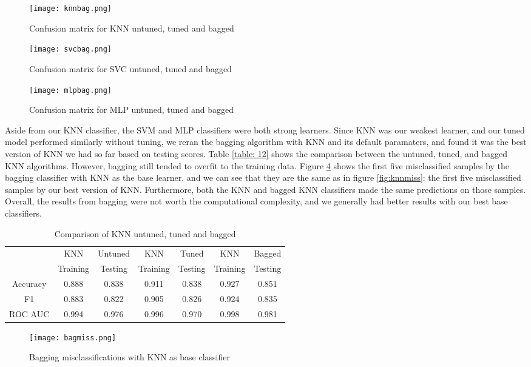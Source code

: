 \documentclass[12pt]{article}
\begin{document}
\begin{figure}[h]
	\centering
	\texttt{[image: knnbag.png]}
	\caption{Confusion matrix for KNN untuned, tuned and bagged}
	\label{fig:knnconf}
\end{figure}

\begin{figure}[h]
	\centering
	\texttt{[image: svcbag.png]}
	\caption{Confusion matrix for SVC untuned, tuned and bagged}
	\label{fig:svcconf}
\end{figure}
\begin{figure}[h]
	\centering
	\texttt{[image: mlpbag.png]}
	\caption{Confusion matrix for MLP untuned, tuned and bagged}
	\label{fig:mlpconf}
\end{figure}


\FloatBarrier

Aside from our KNN classifier, the SVM and MLP classifiers were both strong learners. Since KNN was our weakest learner, and our tuned model performed similarly without tuning, we reran the bagging algorithm with KNN and its default paramaters, and found it was the best version of KNN we had so far based on testing scores. Table \ref{table: 12} shows the comparison between the untuned, tuned, and bagged KNN algorithms. However, bagging still tended to overfit to the training data. Figure \ref{bagmiss} shows the first five misclassified samples by the bagging classifier with KNN as the base learner, and we can see that they are the same as in figure \ref{fig:knnmiss}: the first five misclassified samples by our best version of KNN. Furthermore, both the KNN and bagged KNN classifiers made the same predictions on those samples. Overall, the results from bagging were not worth the computational complexity, and we generally had better results with our best base classifiers.

\begin{table}[h!]
	\centering
	\begin{tabular}{| c|cc|cc|cc|} 
		\hline
		&KNN&Untuned&KNN&Tuned&KNN&Bagged\\
		& Training & Testing& Training & Testing& Training & Testing\\ \hline
		Accuracy & 0.888& 0.838 & 0.911 &0.838& 0.927 &0.851  \\ 
		F1  &  0.883 &0.822&  0.905 &0.826& 0.924 &0.835\\ 
		ROC AUC & 0.994 & 0.976 & 0.996 &0.970& 0.998 &0.981\\
		\hline
	\end{tabular}
	\caption{Comparison of KNN untuned, tuned and bagged}
	\label{table: 11}
\end{table}
\begin{figure}[h]
	\centering
	\texttt{[image: bagmiss.png]}
	\caption{Bagging misclassifications with KNN as base classifier}
	\label{bagmiss}
\end{figure}
\FloatBarrier
\end{document}
